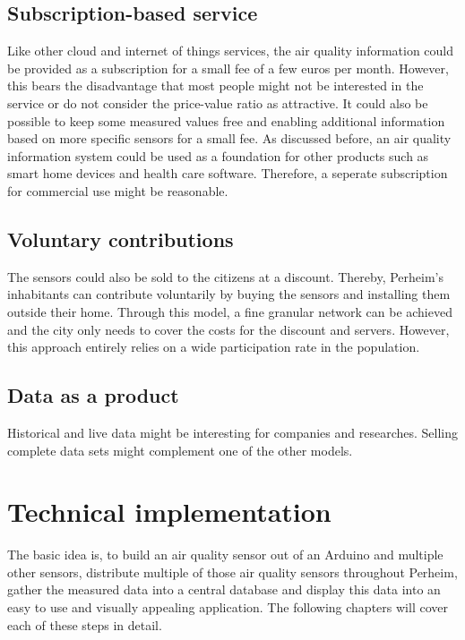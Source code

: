 \documentclass[conference]{IEEEtran}
\begin{document}
\subsection{Subscription-based service}
Like other cloud and internet of things services, the air quality information could be provided as a subscription for a small fee of a few euros per month. However, this bears the disadvantage that most people might not be interested in the service or do not consider the price-value ratio as attractive. It could also be possible to keep some measured values free and enabling additional information based on more specific sensors for a small fee.
As discussed before, an air quality information system could be used as a foundation for other products such as smart home devices and health care software. Therefore, a seperate subscription for commercial use might be reasonable.

\subsection{Voluntary contributions}
The sensors could also be sold to the citizens at a discount. Thereby, Perheim's inhabitants can contribute voluntarily by buying the sensors and installing them outside their home. Through this model, a fine granular network can be achieved and the city only needs to cover the costs for the discount and servers. However, this approach entirely relies on a wide participation rate in the population.

\subsection{Data as a product}
Historical and live data might be interesting for companies and researches. Selling complete data sets might complement one of the other models. 

\section{Technical implementation}\label{sec:TechnicalImplementation}
The basic idea is, to build an air quality sensor out of an Arduino and multiple other sensors, distribute multiple of those air quality sensors throughout Perheim, gather the measured data into a central database and display this data into an easy to use and visually appealing application. The following chapters will cover each of these steps in detail.
\end{document}
